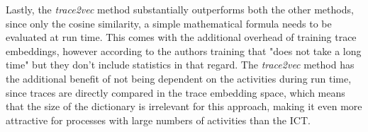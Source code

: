 \documentclass[runningheads]{template/llncs}
\begin{document}
Lastly, the \emph{trace2vec} method substantially outperforms both the other methods, since only the cosine similarity, a simple mathematical formula needs to be evaluated at run time.
This comes with the additional overhead of training trace embeddings, however according to the authors training that "does not take a long time" but they don't include statistics in that regard.
The \emph{trace2vec} method has the additional benefit of not being dependent on the activities during run time, since traces are directly compared in the trace embedding space, which means that the size of the dictionary is irrelevant for this approach, making it even more attractive for processes with large numbers of activities than the ICT.
\end{document}
